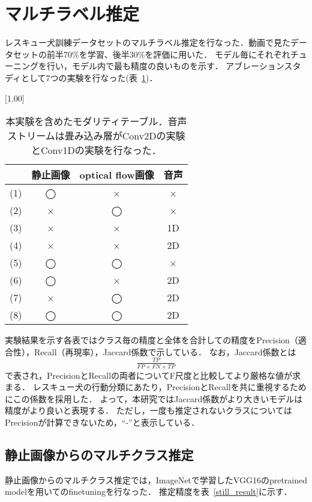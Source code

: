 \section{マルチラベル推定}
レスキュー犬訓練データセットのマルチラベル推定を行なった．動画で見たデータセットの前半70\%を学習、後半30\%を評価に用いた．
モデル毎にそれぞれチューニングを行い，モデル内で最も精度の良いものを示す．
アブレーションスタディとして7つの実験を行なった(表~\ref{ablation})．
\begin{table}[tb]
 \centering
 \caption{本実験を含めたモダリティテーブル．音声ストリームは畳み込み層がConv2Dの実験とConv1Dの実験を行なった．}\label{ablation}
 \scalebox{1.00}[1.00]{
  \begin{tabular}{|l||c|c|c|}
\hline \hline
&静止画像&optical flow画像&音声 \\ \hline \hline
(1) & ◯ & × & × \\ \hline
(2) & × & ◯ & × \\ \hline
(3) & × & × &1D \\ \hline
(4) & × & × &2D \\ \hline
(5) & ◯ & ◯ & × \\ \hline
(6) & ◯ & × &2D\\ \hline
(7) & × & ◯ &2D\\ \hline
(8) & ◯ & ◯ &2D\\ \hline

  \end{tabular}
 }
\end{table}

実験結果を示す各表ではクラス毎の精度と全体を合計しての精度をPrecision（適合性），Recall（再現率），Jaccard係数で示している．
なお，Jaccard係数とは\[\tfrac{TP}{FP+FN+TP}\]で表され，PrecisionとRecallの両者についてF尺度と比較してより厳格な値が求まる．
レスキュー犬の行動分類にあたり，PrecisionとRecallを共に重視するためにこの係数を採用した．
よって，本研究ではJaccard係数がより大きいモデルは精度がより良いと表現する．
ただし，一度も推定されないクラスについてはPrecisionが計算できないため，``-''と表示している．

\subsection{静止画像からのマルチクラス推定}
静止画像からのマルチクラス推定では，ImageNetで学習したVGG16のpretrained modelを用いてのfinetuningを行なった．
推定精度を表~\ref{still_result}に示す．

